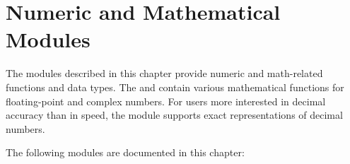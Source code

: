 \chapter{Numeric and Mathematical Modules}
\label{numeric}

The modules described in this chapter provide
numeric and math-related functions and data types.
The  and  contain 
various mathematical functions for floating-point and complex numbers.
For users more interested in decimal accuracy than in speed, the 
 module supports exact representations of  decimal numbers.

The following modules are documented in this chapter:

\localmoduletable
